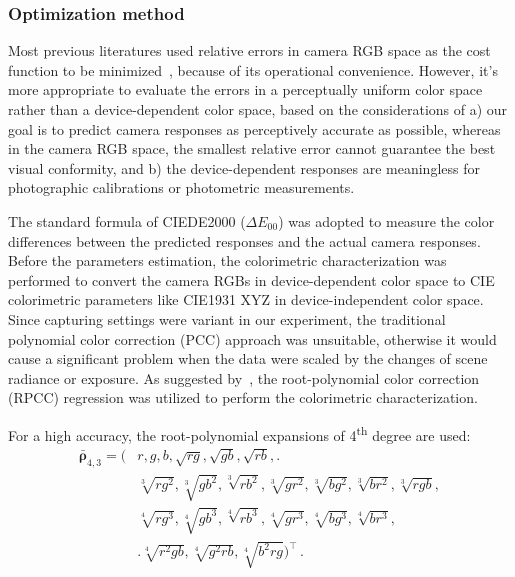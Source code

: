 \documentclass[9pt,twocolumn,twoside]{osajnl}
\begin{document}
\subsubsection{Optimization method}\label{sec:optimization method}

Most previous literatures used relative errors in camera RGB space as the cost function to be minimized~\cite{Urban:10,Barnard:02,Finlayson:98,Huynh:14,Ebner:07,Prasad:13}, because of its operational convenience. However, it’s more appropriate to evaluate the errors in a perceptually uniform color space rather than a device-dependent color space, based on the considerations of a) our goal is to predict camera responses as perceptively accurate as possible, whereas in the camera RGB space, the smallest relative error cannot guarantee the best visual conformity, and b) the device-dependent responses are meaningless for photographic calibrations or photometric measurements.

The standard formula of CIEDE2000 ($\Delta{}E_{00}$) was adopted to measure the color differences between the predicted responses and the actual camera responses. Before the parameters estimation, the colorimetric characterization was performed to convert the camera RGBs in device-dependent color space to CIE colorimetric parameters like CIE1931 XYZ in device-independent color space. Since capturing settings were variant in our experiment, the traditional polynomial color correction (PCC) approach was unsuitable, otherwise it would cause a significant problem when the data were scaled by the changes of scene radiance or exposure. As suggested by~\cite{Finlayson:15}, the root-polynomial color correction (RPCC) regression was utilized to perform the colorimetric characterization.

For a high accuracy, the root-polynomial expansions of 4\textsuperscript{th} degree are used:
\begin{equation}
\begin{split}
\bar{\boldsymbol{\rho}}_{4,3} = \biggl(& r, g, b, \sqrt{rg}, \sqrt{gb}, \sqrt{rb},\biggr. \\
& \sqrt[3]{rg^2}, \sqrt[3]{gb^2}, \sqrt[3]{rb^2}, \sqrt[3]{gr^2}, \sqrt[3]{bg^2}, \sqrt[3]{br^2}, \sqrt[3]{rgb}, \\
& \sqrt[4]{rg^3}, \sqrt[4]{gb^3}, \sqrt[4]{rb^3}, \sqrt[4]{gr^3}, \sqrt[4]{bg^3}, \sqrt[4]{br^3}, \\
& \biggl.\sqrt[4]{r^2gb}, \sqrt[4]{g^2rb}, \sqrt[4]{b^2rg}\biggr)^\intercal\,.
\end{split}
\label{eq:11}
\end{equation}
\end{document}
